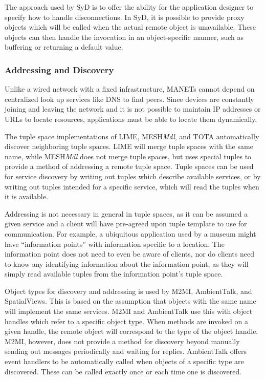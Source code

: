 The approach used by SyD is to offer the ability for the application designer to specify how to handle disconnections. In SyD, it is possible to provide proxy objects which will be called when the actual remote object is unavailable. These objects can then handle the invocation in an object-specific manner, such as buffering or returning a default value. 

\subsubsection{Addressing and Discovery}

Unlike a wired network with a fixed infrastructure, MANETs cannot depend on centralized look up services like DNS to find peers. Since devices are constantly joining and leaving the network and it is not possible to maintain IP addresses or URLs to locate resources, applications must be able to locate them dynamically.

The tuple space implementations of LIME, MESH\textit{Mdl}, and TOTA automatically discover neighboring tuple spaces. LIME will merge tuple spaces with the same name, while MESH\textit{Mdl} does not merge tuple spaces, but uses special tuples to provide a method of addressing a remote tuple space. Tuple spaces can be used for service discovery by writing out tuples which describe available services, or by writing out tuples intended for a specific service, which will read the tuples when it is available.

Addressing is not necessary in general in tuple spaces, as it can be assumed a given service and a client will have pre-agreed upon tuple template to use for communication. For example, a ubiquitous application used by a museum might have ``information points'' with information specific to a location. The information point does not need to even be aware of clients, nor do clients need to know any identifying information about the information point, as they will simply read available tuples from the information point's tuple space.

Object types for discovery and addressing is used by M2MI, AmbientTalk, and SpatialViews. This is based on the assumption that objects with the same name will implement the same services. M2MI and AmbientTalk use this with object handles which refer to a specific object type. When methods are invoked on a given handle, the remote object will correspond to the type of the object handle. M2MI, however, does not provide a method for discovery beyond manually sending out messages periodically and waiting for replies. AmbientTalk offers event handlers to be automatically called when objects of a specific type are discovered. These can be called exactly once or each time one is discovered.

